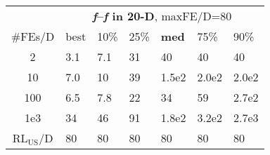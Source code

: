 \begin{tabular}{c|llllll}
 & \multicolumn{6}{|c}{\textbf{\textit{f}\raisebox{-0.35ex}{1}--\textit{f}\raisebox{-0.35ex}{24} in 20-D}, maxFE/D=80}\\
\#FEs/D & best & 10\% & 25\% & \textbf{med} & 75\% & 90\%\\
2 & \hspace*{1ex}3.1 & \hspace*{1ex}7.1 & 31 & 40 & 40 & 40\\
10 & \hspace*{1ex}7.0 & 10 & 39 & 1.5e2 & 2.0e2 & 2.0e2\\
100 & \hspace*{1ex}6.5 & \hspace*{1ex}7.8 & 22 & 34 & 59 & 2.7e2\\
1e3 & 34 & 46 & 91 & 1.8e2 & 3.2e2 & 2.7e3\\
$\text{RL}_{\text{US}}$/D & 80 & 80 & 80 & 80 & 80 & 80
\end{tabular}
